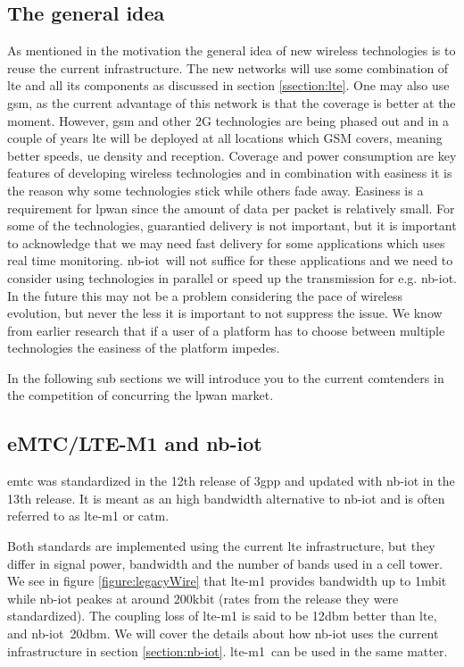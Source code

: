 \documentclass[USenglish]{ifimaster}  %
\begin{document}
\subsection{The general idea}
As mentioned in the motivation the general idea of new wireless technologies is to reuse the current infrastructure. The new networks will use some combination of \acrshort{lte} and all its components as discussed in section \vref{ssection:lte}. One may also use \acrshort{gsm}, as the current advantage of this network is that the coverage is better at the moment. However, \acrshort{gsm} and other 2G technologies are being phased out and in a couple of years \acrshort{lte} will be deployed at all locations which GSM covers, meaning better speeds, \acrshort{ue} density and reception. Coverage and power consumption are key features of developing wireless technologies and in combination with easiness it is the reason why some technologies stick while others fade away. Easiness is a requirement for \acrshort{lpwan} since the amount of data per packet is relatively small. For some of the technologies, guarantied delivery is not important, but it is important to acknowledge that we may need fast delivery for some applications which uses real time monitoring.
\acrshort{nb-iot} will not suffice for these applications and we need to consider using technologies in parallel or speed up the transmission for e.g. \acrshort{nb-iot}. In the future this may not be a problem considering the pace of wireless evolution, but never the less it is important to not suppress the issue. We know from earlier research that if a user of a platform has to choose between multiple technologies the easiness of the platform impedes.

In the following sub sections we will introduce you to the current comtenders in the competition of concurring the \acrshort{lpwan} market.

\subsection{eMTC/LTE-M1 and \acrshort{nb-iot}}
\acrfull{emtc} was standardized in the 12th release of \acrshort{3gpp} and updated with \acrshort{nb-iot} in the 13th release. It is meant as an high bandwidth alternative to \acrshort{nb-iot} and is often referred to as \acrshort{lte-m1} or \acrshort{catm}.

Both standards are implemented using the current \acrshort{lte} infrastructure, but they differ in signal power, bandwidth and the number of bands used in a cell tower. We see in figure \vref{figure:legacyWire} that \acrshort{lte-m1} provides bandwidth up to 1\acrshort{mbit} while \acrshort{nb-iot} peakes at around 200\acrshort{kbit} (rates from the release they were standardized). The coupling loss of \acrshort{lte-m1} is said to be 12\acrshort{dbm} better than \acrshort{lte}, and \acrshort{nb-iot} 20\acrshort{dbm}. We will cover the details about how \acrshort{nb-iot} uses the current infrastructure in section \vref{section:nb-iot}. \acrshort{lte-m1} can be used in the same matter.
\end{document}
